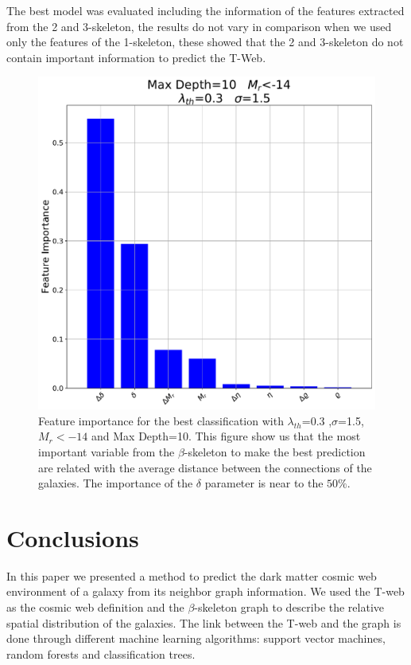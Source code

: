 \documentclass[usenatbib]{mnras}
\begin{document}
The best model was evaluated including the information of the features extracted from the 2 and 3-skeleton, the results do not vary in comparison when we used only the features of the 1-skeleton, these showed that the 2 and 3-skeleton do not contain important information to predict the T-Web.

\begin{figure}
\centering
    \includegraphics[scale=0.32]{Figs/p_FI_EnvPredTreeClass.pdf}  
    \caption{Feature importance for the best classification with $\lambda_{th}$=0.3 ,$\sigma$=1.5, $M_{r}<-14$ and Max Depth=10. This figure show us that the most important variable from the $\beta$-skeleton to make the best prediction are related with the average distance between the connections of the galaxies. The importance of the $\delta$ parameter is near to the $50\%$.}
    \label{fig:feature_importance}     
\end{figure}

\section{Conclusions}

In this paper we presented a method to predict the dark matter cosmic web
environment of a galaxy from its neighbor graph information.
We used the T-web as the cosmic web definition \citep{2009Forero-Romero}
and the $\beta$-skeleton graph \citep{2019Fang} 
to describe the relative spatial distribution of the galaxies. 
The link between the T-web and the graph is done through different
machine learning algorithms: support vector machines, random forests and
classification trees.
\end{document}
